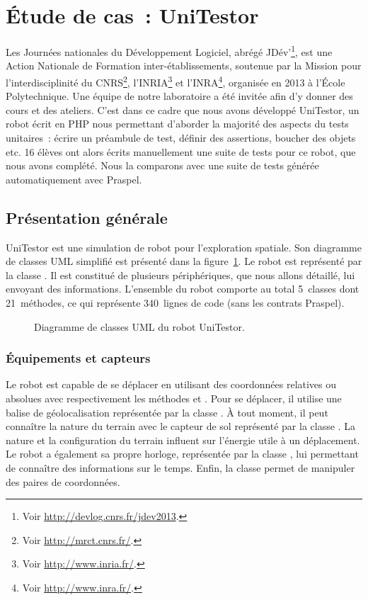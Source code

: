 \section{Étude de cas~: UniTestor}
\label{section:experimentation:unitestor}

Les Journées nationales du Développement Logiciel, abrégé JDév'\footnote{Voir
\url{http://devlog.cnrs.fr/jdev2013}.}, est une Action Nationale de Formation
inter-établissements, soutenue par la Mission pour l'interdisciplinité du
CNRS\footnote{Voir \url{http://mrct.cnrs.fr/}.}, l'INRIA\footnote{Voir
\url{http://www.inria.fr/}.} et l'INRA\footnote{Voir
\url{http://www.inra.fr/}.}, organisée en 2013 à l'École Polytechnique. Une
équipe de notre laboratoire a été invitée afin d'y donner des cours et des
ateliers. C'est dans ce cadre que nous avons développé UniTestor, un robot écrit
en PHP nous permettant d'aborder la majorité des aspects du tests unitaires~:
écrire un préambule de test, définir des assertions, boucher des objets etc. 16
élèves ont alors écrits manuellement une suite de tests pour ce robot, que nous
avons complété. Nous la comparons avec une suite de tests générée
automatiquement avec Praspel.

\subsection{Présentation générale}

UniTestor est une simulation de robot pour l'exploration spatiale. Son diagramme
de classes UML simplifié est présenté dans la
figure~\ref{figure:experimentation:unitestor}. Le robot est représenté par la
classe . Il est constitué de plusieurs périphériques, que nous
allons détaillé, lui envoyant des informations. L'ensemble du robot comporte au
total 5~classes dont 21~méthodes, ce qui représente 340~lignes de code (sans les
contrats Praspel).
%
\begin{figure}


\caption{\label{figure:experimentation:unitestor} Diagramme de classes UML du
robot UniTestor.}

\end{figure}

\subsubsection{Équipements et capteurs}

Le robot est capable de se déplacer en utilisant des coordonnées relatives ou
absolues avec respectivement les méthodes  et . Pour se
déplacer, il utilise une balise de géolocalisation représentée par la classe
. À tout moment, il peut connaître la nature du terrain avec
le capteur de sol représenté par la classe . La nature et la
configuration du terrain influent sur l'énergie utile à un déplacement. Le robot
a également sa propre horloge, représentée par la classe , lui
permettant de connaître des informations sur le temps. Enfin, la classe
 permet de manipuler des paires de coordonnées.

